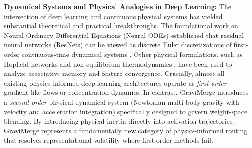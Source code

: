 \textbf{Dynamical Systems and Physical Analogies in Deep Learning: } The intersection of deep learning and continuous physical systems has yielded substantial theoretical and practical breakthroughs. The foundational work on Neural Ordinary Differential Equations (Neural ODEs) \cite{chen2018neuralode} established that residual neural networks (ResNets) can be viewed as discrete Euler discretizations of first-order continuous-time dynamical systems \cite{weinan2017proposal, haber2017stable, lu2018beyond, grathwohl2018ffjord}. Other physical formulations, such as Hopfield networks \cite{hopfield1982neural, krotov2016dense} and non-equilibrium thermodynamics \cite{prigogine1978time, nicolis1977self}, have been used to analyze associative memory and feature convergence. Crucially, almost all existing physics-informed deep learning architectures operate as \textit{first-order} gradient-like flows or concentration dynamics. In contrast, GraviMerge introduces a \textit{second-order} physical dynamical system (Newtonian multi-body gravity with velocity and acceleration integration) specifically designed to govern weight-space blending. By introducing physical inertia directly into activation trajectories, GraviMerge represents a fundamentally new category of physics-informed routing that resolves representational volatility where first-order methods fail.
